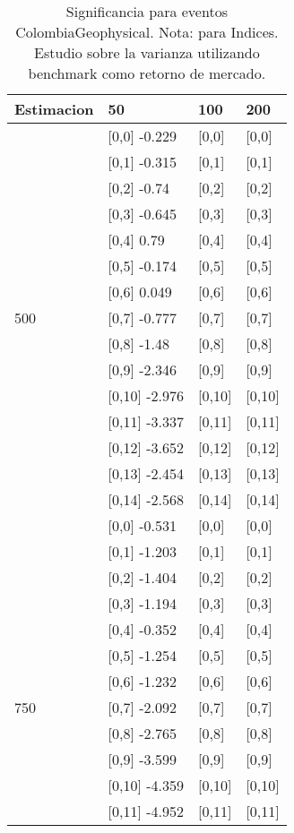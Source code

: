 \begin{table}

\caption{Significancia para eventos ColombiaGeophysical. Nota: para Indices. Estudio sobre la varianza utilizando benchmark como retorno de mercado.}
\centering
\begin{tabular}[t]{llll}
\toprule
Estimacion & 50 & 100 & 200\\
\midrule
 & {}[0,0] -0.229 & {}[0,0] & {}[0,0]\\
 & {}[0,1] -0.315 & {}[0,1] & {}[0,1]\\
 & {}[0,2] -0.74 & {}[0,2] & {}[0,2]\\
 & {}[0,3] -0.645 & {}[0,3] & {}[0,3]\\
 & {}[0,4] 0.79 & {}[0,4] & {}[0,4]\\
\addlinespace
 & {}[0,5] -0.174 & {}[0,5] & {}[0,5]\\
 & {}[0,6] 0.049 & {}[0,6] & {}[0,6]\\
500 & {}[0,7] -0.777 & {}[0,7] & {}[0,7]\\
 & {}[0,8] -1.48 & {}[0,8] & {}[0,8]\\
 & {}[0,9] -2.346 & {}[0,9] & {}[0,9]\\
\addlinespace
 & {}[0,10] -2.976 & {}[0,10] & {}[0,10]\\
 & {}[0,11] -3.337 & {}[0,11] & {}[0,11]\\
 & {}[0,12] -3.652 & {}[0,12] & {}[0,12]\\
 & {}[0,13] -2.454 & {}[0,13] & {}[0,13]\\
 & {}[0,14] -2.568 & {}[0,14] & {}[0,14]\\
\addlinespace
 & {}[0,0] -0.531 & {}[0,0] & {}[0,0]\\
 & {}[0,1] -1.203 & {}[0,1] & {}[0,1]\\
 & {}[0,2] -1.404 & {}[0,2] & {}[0,2]\\
 & {}[0,3] -1.194 & {}[0,3] & {}[0,3]\\
 & {}[0,4] -0.352 & {}[0,4] & {}[0,4]\\
\addlinespace
 & {}[0,5] -1.254 & {}[0,5] & {}[0,5]\\
 & {}[0,6] -1.232 & {}[0,6] & {}[0,6]\\
750 & {}[0,7] -2.092 & {}[0,7] & {}[0,7]\\
 & {}[0,8] -2.765 & {}[0,8] & {}[0,8]\\
 & {}[0,9] -3.599 & {}[0,9] & {}[0,9]\\
\addlinespace
 & {}[0,10] -4.359 & {}[0,10] & {}[0,10]\\
 & {}[0,11] -4.952 & {}[0,11] & {}[0,11]\\

\end{tabular}
\end{table}

